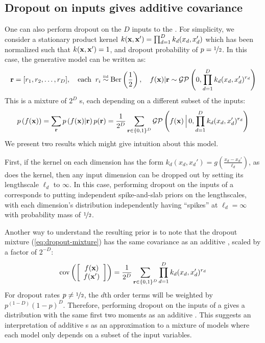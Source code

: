 \subsection{Dropout on inputs gives additive covariance}
One can also perform dropout on the $D$ inputs to the \gp{}.
For simplicity, we consider a stationary product kernel ${k({\bf{x}}, {\bf{x}}') = \prod_{d=1}^D k_d(x_d, x_d')}$ which has been normalized such that $k({\bf{x}}, {\bf{x}}') = 1$, and dropout probability of $p = \nicefrac{1}{2}$.
In this case, the generative model can be written as:
%
\begin{align}
{\bf{r}} = [r_1, r_2, \dots, r_D], \quad \textnormal{each} \;\; r_i \overset{\mbox{\tiny iid}}{\sim} \textnormal{Ber} \left( \frac{1}{2} \right), \quad f({\bf{x}}) | {\bf{r}} \sim \mathcal{GP} \left( 0, \prod_{d=1}^D k_d(x_d, x_d')^{r_d} \right)
\end{align}
%
This is a mixture of $2^D$ \gp{}s, each depending on a different subset of the inputs:
%
\begin{align}
p \left( f({\bf{x}}) \right) = 
\sum_{{\bf{r}}} p \left( f({\bf{x}}) | {\bf{r}} \right) p( {\bf{r}}) = 
\frac{1}{2^D} \sum_{{\bf{r}} \in \{0,1\}^D}  \mathcal{GP} \left(f({\bf{x}}) \,\Big|\, 0, \prod_{d=1}^D k_d(x_d, x_d')^{r_d} \right)
\label{eq:dropout-mixture}
\end{align}
We present two results which might give intuition about this model.

First, if the kernel on each dimension has the form ${k_d(x_d, x_d') = g \left( \frac{x_d - x_d'}{\ell_d} \right)}$, as does the \kSE{} kernel, then any input dimension can be dropped out by setting its lengthscale $\ell_d$ to $\infty$.
In this case, performing dropout on the inputs of a \gp{} corresponds to putting independent spike-and-slab priors on the lengthscales, with each dimension's distribution independently having ``spikes'' at $\ell_d = \infty$ with probability mass of $\nicefrac{1}{2}$.



Another way to understand the resulting prior is to note that the dropout mixture (\cref{eq:dropout-mixture}) has the same covariance as an additive \gp{}, scaled by a factor of $2^{-D}$:
\begin{align}
\operatorname{cov}\left( \left[ \begin{array}{c} {f({\bf{x}})} \\ {f({\bf{x}}')} \end{array} \right] \right) = \frac{1}{2^{D}} \sum_{{\bf{r}} \in \{0,1\}^D}  \prod_{d=1}^D k_d(x_d, x_d')^{r_d}
\label{eq:dropout-mixture-covariance}
\end{align}
%
For dropout rates $p \neq \nicefrac{1}{2}$, the $d$th order terms will be weighted by $p^{(1-D)}(1-p)^D$.
Therefore, performing dropout on the inputs of a \gp{} gives a distribution with the same first two moments as an additive \gp{}.
This suggests an interpretation of additive \gp{}s as an approximation to a mixture of models where each model only depends on a subset of the input variables.






